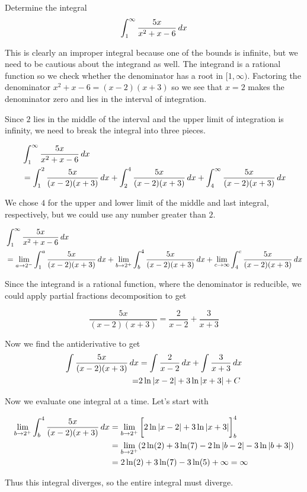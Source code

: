\documentclass{ximera}
\begin{document}
\begin{example}
Determine the integral
\[
\int_{1}^{\infty} \frac{5x}{x^2+x-6} \mathop{}\!d x 
\]


\begin{explanation}
This is clearly an improper integral because one of the bounds is infinite, but we need to be cautious about the integrand as well. The integrand is a rational function so we check whether the denominator has a root in $[1,\infty)$.  Factoring the denominator $x^2+x-6=(x-2)(x+3)$ so we see that $x=2$ makes the denominator zero and lies in the interval of integration. 

Since $2$ lies in the middle of the interval and the upper limit of integration is infinity, we need to break the integral into three pieces.

\begin{align*}
& \int_{1}^{\infty} \frac{5x}{x^2+x-6} \mathop{}\!d x \\
&= \int_{1}^{2} \frac{5x}{(x-2)(x+3)} \mathop{}\!d x  + \int_{2}^{4} \frac{5x}{(x-2)(x+3)} \mathop{}\!d x + \int_{4}^{\infty} \frac{5x}{(x-2)(x+3)} \mathop{}\!d x\\
\end{align*}

We chose $4$ for the upper and lower limit of the middle and last integral, respectively, but we could use any number greater than $2$.

\begin{align*}
 & \int_{1}^{\infty} \frac{5x}{x^2+x-6} \mathop{}\!d x \\
        &=\lim_{a \to 2^{-}} \int_{1}^a \frac{5x}{(x-2)(x+3)} \mathop{}\!d x + \lim_{b \to 2^{+}} \int_{b}^{4} \frac{5x}{(x-2)(x+3)} \mathop{}\!d x +\lim_{c \to \infty} \int_{4}^{c} \frac{5x}{(x-2)(x+3)} \mathop{}\!d x
\end{align*}

Since the integrand is a rational function, where the denominator is reducible, we could apply partial fractions decomposition to get

\[
\frac{5x}{(x-2)(x+3)}=\frac{ 2}{x-2} +\frac{ 3}{x+3}
\]


Now we find the antiderivative to get 
\begin{align*}
\int \frac{5x}{(x-2)(x+3)} \mathop{}\!d x&=\int \frac{ 2}{x-2} \mathop{}\!d x + \int \frac{ 3}{x+3} \mathop{}\!d x \\
=& 2\ln|x-2| + 3\ln|x+3 | + C
\end{align*}


Now we evaluate one integral at a time.  Let's start with

\begin{align*}
\lim_{b \to 2^{+}} \int_{b}^{4} \frac{5x}{(x-2)(x+3)} \mathop{}\!d x&= \lim_{b \to 2^{+}} \bigg[  2\ln|x-2| + 3\ln|x+3 |  \bigg]_{b}^{4} \\
&=\lim_{b \to 2^{+}} (2\ln(2) + 3 \ln(7) - 2\ln|b-2| -3\ln|b+3| ) \\
&=2\ln(2) +3\ln(7)-3\ln(5) + \infty=\infty
\end{align*}

Thus this integral diverges, so the entire integral must diverge. 

\end{explanation}
\end{example}
\end{document}
